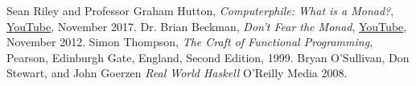 \begin{thebibliography}{9}
  Sean Riley and Professor Graham Hutton,
  \textit{Computerphile: What is a Monad?},
  \href{https://youtu.be/t1e8gqXLbsU}{YouTube},
  November 2017.
  Dr. Brian Beckman,
  \textit{Don't Fear the Monad},
  \href{https://youtu.be/ZhuHCtR3xq8}{YouTube},
  November 2012.
  Simon Thompson,
  \textit{The Craft of Functional Programming},
  Pearson, Edinburgh Gate, England,
  Second Edition,
  1999.
  Bryan O'Sullivan, Don Stewart, and John Goerzen
  \textit{Real World Haskell}
  O'Reilly Media
  2008.
\end{thebibliography}
